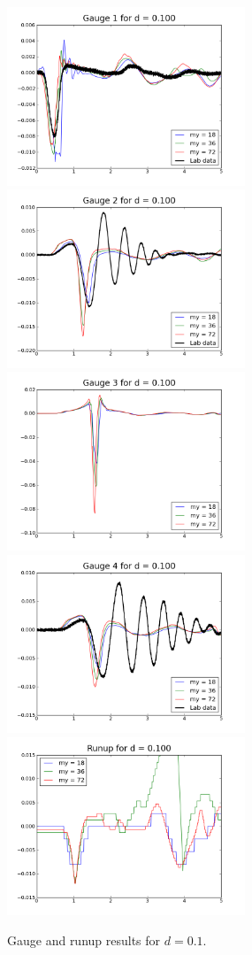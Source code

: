 \begin{figure}[ht]

\hfil\includegraphics[width=2.8in]{bp3/gauge1-d0-1.png}\hfil
\hfil\includegraphics[width=2.8in]{bp3/gauge2-d0-1.png}\hfil
\vskip 10pt
\hfil\includegraphics[width=2.8in]{bp3/gauge3-d0-1.png}\hfil
\hfil\includegraphics[width=2.8in]{bp3/gauge4-d0-1.png}\hfil
\vskip 10pt
\hfil\includegraphics[width=2.8in]{bp3/runup-d0-1.png}\hfil

\caption{\label{fig:bp3gauge3} 
Gauge and runup results for $d=0.1$.
  }
\end{figure}



